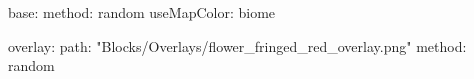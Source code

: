 base:
  method: random
  useMapColor: biome
  
overlay:
  path: "Blocks/Overlays/flower_fringed_red_overlay.png"
  method: random